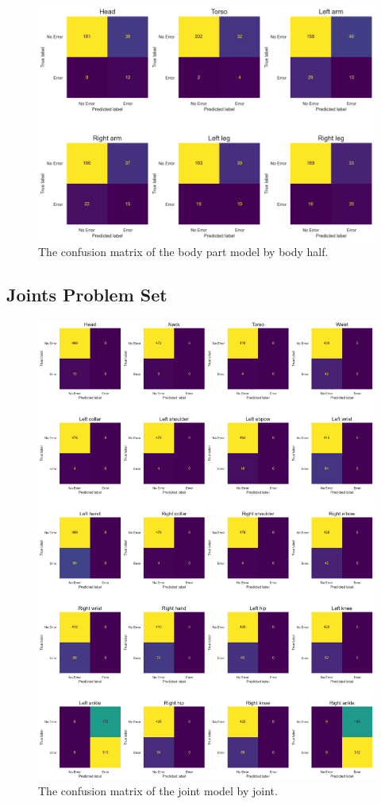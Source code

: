 \begin{figure}[ht]
  \centering
  \includegraphics[width=\textwidth]{figures/Results/v1/confusion/body_parts_part.png}
  \caption[Body Part Model Confusion Matrix by Body Half]{The confusion matrix of the body part model by body half.}
  \label{fig:conf_v1_bp}
\end{figure}

\subsection{Joints Problem Set}



\begin{figure}[ht]
  \centering
  \includegraphics[width=\textwidth]{figures/Results/v1/confusion/joints_joint.png}
  \caption[Joint Model Confusion Matrix by Joint]{The confusion matrix of the joint model by joint.}
  \label{fig:conf_v1_bp}
\end{figure}